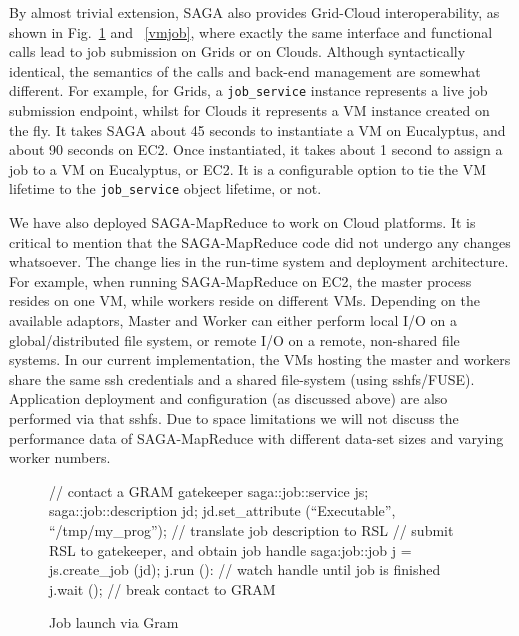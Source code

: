 \documentclass[conference,final]{IEEEtran}
\newcommand{\sagamapreduce }{SAGA-MapReduce }
\newcommand{\upp}{\vspace*{-0.5em}}
\begin{document}
By almost trivial extension, SAGA also provides Grid-Cloud
interoperability, as shown in Fig.~\ref{gramjob} and ~\ref{vmjob},
where exactly the same interface and functional calls lead to job
submission on Grids or on Clouds. Although syntactically identical,
the semantics of the calls and back-end management are somewhat
different.  For example, for Grids, a \texttt{job\_service} instance
represents a live job submission endpoint, whilst for Clouds it
represents a VM instance created on the fly.  It takes SAGA about 45
seconds to instantiate a VM on Eucalyptus, and about 90 seconds on
EC2. Once instantiated, it takes about 1 second to assign a job to a
VM on Eucalyptus, or EC2.  It is a configurable option to tie the VM
lifetime to the \texttt{job\_service} object lifetime, or not.

We have also deployed \sagamapreduce to work on Cloud platforms.  It
is critical to mention that the \sagamapreduce code did not undergo
any changes whatsoever. The change lies in the run-time system and
deployment architecture. For example, when running \sagamapreduce on
EC2, the master process resides on one VM, while workers reside on
different VMs.  Depending on the available adaptors, Master and Worker
can either perform local I/O on a global/distributed file system, or
remote I/O on a remote, non-shared file systems.  In our current
implementation, the VMs hosting the master and workers share the same
ssh credentials and a shared file-system (using sshfs/FUSE).
Application deployment and configuration (as discussed above) are also
performed via that sshfs.  Due to space limitations we will not
discuss the performance data of \sagamapreduce with different data-set
sizes and varying worker numbers.

\begin{figure}[!ht]
\upp
 \begin{center}
  \begin{mycode}[label=SAGA Job Launch via GRAM gatekeeper]
   { // contact a GRAM gatekeeper
    saga::job::service     js;
    saga::job::description jd;
    jd.set_attribute (``Executable'', ``/tmp/my_prog'');
    // translate job description to RSL
    // submit RSL to gatekeeper, and obtain job handle
    saga:job::job j = js.create_job (jd);
    j.run ():
    // watch handle until job is finished
    j.wait ();
   } // break contact to GRAM
  \end{mycode}
  \caption{\label{gramjob}Job launch via Gram }
 \end{center}
\upp
\end{figure}
\end{document}
